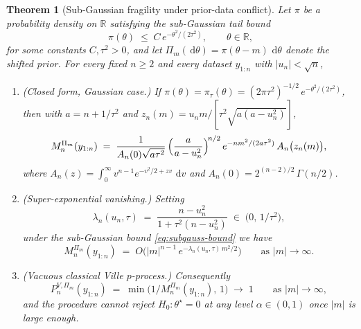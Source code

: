 \documentclass{article}%
\newtheorem{theorem}{Theorem}[section]
\newcommand{\dd}{\,\mathrm{d}}
\newcommand{\1}{\mathbf{1}}
\begin{document}
\begin{theorem}[Sub-Gaussian fragility under prior-data conflict]
\label{thm:subgaussian-failure}
Let $\pi$ be a probability density on $\mathbb{R}$ satisfying the sub-Gaussian tail bound
\begin{equation}\label{eq:subgauss-bound}
   \pi(\theta) \;\le\; C\, e^{-\theta^{2}/(2\tau^{2})}, \qquad \theta\in\mathbb R,
\end{equation}
for some constants $C,\tau^{2}>0$, and let $\Pi_{m}(\dd\theta)=\pi(\theta-m)\,\dd\theta$ denote the shifted prior. For every fixed $n\ge 2$ and every dataset $y_{1:n}$ with $|u_{n}|<\sqrt n$,
\begin{enumerate}%
\item[(i)] (Closed form, Gaussian case.) If $\pi(\theta)=\pi_{\tau}(\theta)=(2\pi\tau^{2})^{-1/2}\,e^{-\theta^{2}/(2\tau^{2})}$, then with
   $a=n+1/\tau^{2}$ and
   $z_{n}(m)=u_{n}m/[\tau^{2}\sqrt{a(a-u_{n}^{2})}]$,
   \begin{equation}\label{eq:M-closed-Gauss}
      M_{n}^{\Pi_{m}}(y_{1:n}) \;=\; \frac{1}{A_{n}(0)\sqrt{a\tau^{2}}}\,\Bigl(\frac{a}{a-u_{n}^{2}}\Bigr)^{\!n/2}\, e^{-nm^{2}/(2a\tau^{2})}\, A_{n}\bigl(z_{n}(m)\bigr),
   \end{equation}
   where $A_{n}(z)=\int_{0}^{\infty}v^{n-1}e^{-v^{2}/2+zv}\,\dd v$ and $A_{n}(0)=2^{(n-2)/2}\,\Gamma(n/2)$.
\item[(ii)] \emph{(Super-exponential vanishing.)} Setting
   \begin{equation}\label{eq:lambda-def}
      \lambda_{n}(u_{n},\tau) \;=\; \frac{n-u_{n}^{2}}{1+\tau^{2}(n-u_{n}^{2})} \;\in\;\bigl(0,\,1/\tau^{2}\bigr),
   \end{equation}
   under the sub-Gaussian bound \eqref{eq:subgauss-bound} we have
   \begin{equation}\label{eq:decay-rate}
      M_{n}^{\Pi_{m}}(y_{1:n}) \;=\; O\!\bigl(|m|^{n-1}\,e^{-\lambda_{n}(u_{n},\tau)\,m^{2}/2}\bigr) \qquad\text{as }|m|\to\infty.
   \end{equation}
\item[(iii)] \emph{(Vacuous classical Ville $p$-process.)} Consequently
   \[
      P_{n}^{V,\Pi_{m}}(y_{1:n}) \;=\; \min\!\bigl(1/M_{n}^{\Pi_{m}}(y_{1:n}),\,1\bigr) \;\longrightarrow\; 1
      \qquad\text{as }|m|\to\infty,
   \]
   and the procedure cannot reject $H_{0}\colon\theta^{\star}=0$ at any level $\alpha\in(0,1)$ once $|m|$ is large enough.
\end{enumerate}
\end{theorem}
\end{document}
